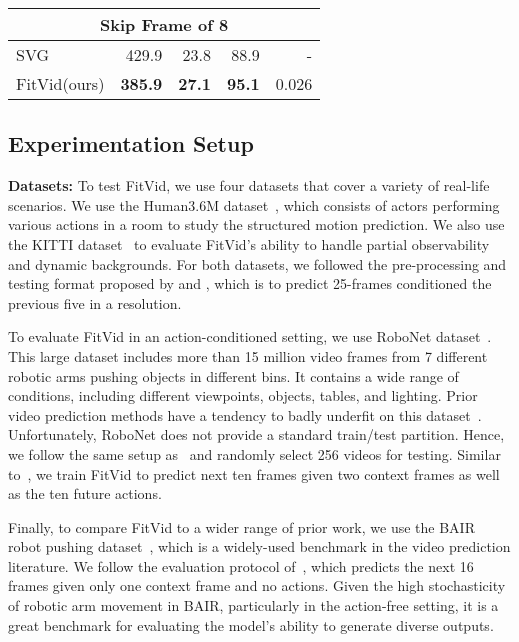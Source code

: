 \documentclass{article}
\newcommand{\model}{FitVid\xspace}
\begin{document}
\begin{table}[t]
\begin{minipage}{.48\textwidth}
\begin{tabular}{lrrrr}
    \multicolumn{5}{c}{Skip Frame of 8}\\\midrule
    SVG~\cite{villegas2019high} &429.9 &23.8 &88.9 &- \\
    \model(ours) &\cellcolor[HTML]{d9ead3}\textbf{385.9} &\cellcolor[HTML]{d9ead3}\textbf{27.1} &\cellcolor[HTML]{d9ead3}\textbf{95.1} &0.026 \\
    \bottomrule
    \end{tabular}
\end{minipage}
\vspace{-0.5cm}
\end{table}


\subsection{Experimentation Setup}
\textbf{Datasets:}
To test \model, we use four datasets that cover a variety of real-life scenarios. We use the Human3.6M dataset~\cite{ionescu2014human3}, which consists of actors performing various actions in a room to study the structured motion prediction. We also use the KITTI dataset~\cite{geiger2013vision} to evaluate \model's ability to handle partial observability and dynamic backgrounds. For both datasets, we followed the pre-processing and testing format proposed by \citet{wu2021greedy} and \citet{villegas2019high}, which is to predict 25-frames conditioned the previous five in a  resolution.

To evaluate \model in an action-conditioned setting, we use RoboNet dataset~\citep{dasari2019robonet}. This large dataset includes more than 15 million video frames from 7 different robotic arms pushing objects in different bins. It contains a wide range of conditions, including different viewpoints, objects, tables, and lighting. Prior video prediction methods have a tendency to badly underfit on this dataset~\citep{dasari2019robonet}. Unfortunately, RoboNet does not provide a standard train/test partition. Hence, we follow the same setup as~\citet{wu2021greedy} and randomly select 256 videos for testing. Similar to~\citet{wu2021greedy}, we train \model to predict next ten frames given two context frames as well as the ten future actions. 

Finally, to compare \model to a wider range of prior work, we use the BAIR robot pushing dataset~\cite{2017arXiv171005268E}, which is a widely-used benchmark in the video prediction literature. We follow the evaluation protocol of~\citet{rakhimov2020latent}, which predicts the next 16 frames given only one context frame and no actions. Given the high stochasticity of robotic arm movement in BAIR, particularly in the action-free setting, it is a great benchmark for evaluating the model's ability to generate diverse outputs.
\end{document}
